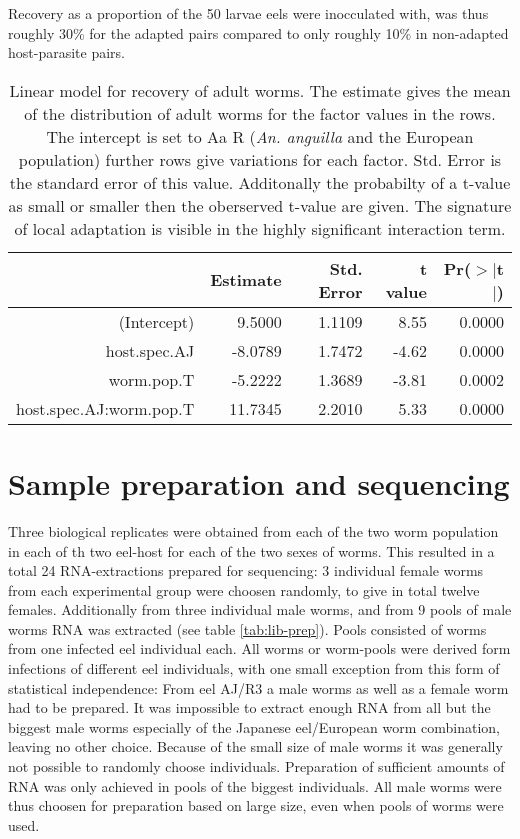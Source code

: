 Recovery as a proportion of the 50 larvae eels were inocculated with,
was thus roughly 30\% for the adapted pairs compared to only roughly
10\% in non-adapted host-parasite pairs.

\begin{table}[ht]
\begin{center}
\begin{tabular}{rrrrr}
  \hline
 & Estimate & Std. Error & t value & Pr($>$$|$t$|$) \\ 
  \hline
  (Intercept) & 9.5000 & 1.1109 & 8.55 & 0.0000 \\ 
  host.spec.AJ & -8.0789 & 1.7472 & -4.62 & 0.0000 \\ 
  worm.pop.T & -5.2222 & 1.3689 & -3.81 & 0.0002 \\ 
  host.spec.AJ:worm.pop.T & 11.7345 & 2.2010 & 5.33 & 0.0000 \\ 
   \hline
\end{tabular}
\caption[Linear model for recovery]{Linear model for recovery of adult
  worms. The estimate gives the mean of the distribution of adult
  worms for the factor values in the rows. The intercept is set to Aa
  R (\textit{An. anguilla} and the European population) further rows
  give variations for each factor. Std. Error is the standard error of
  this value. Additonally the probabilty of a t-value as small or
  smaller then the oberserved t-value are given. The signature of
  local adaptation is visible in the highly significant interaction
  term.}
\label{tab:ad-sig}
\end{center}
\end{table}


\section{Sample preparation and sequencing }

Three biological replicates were obtained from each of the two worm
population in each of th two eel-host for each of the two sexes of
worms. This resulted in a total 24 RNA-extractions prepared for
sequencing: 3 individual female worms from each experimental group
were choosen randomly, to give in total twelve females. Additionally
from three individual male worms, and from 9 pools of male worms RNA
was extracted (see table \ref{tab:lib-prep}). Pools consisted of worms
from one infected eel individual each. All worms or worm-pools were
derived form infections of different eel individuals, with one small
exception from this form of statistical independence: From eel AJ/R3 a
male worms as well as a female worm had to be prepared. It was
impossible to extract enough RNA from all but the biggest male worms
especially of the Japanese eel/European worm combination, leaving no
other choice. Because of the small size of male worms it was generally
not possible to randomly choose individuals. Preparation of sufficient
amounts of RNA was only achieved in pools of the biggest
individuals. All male worms were thus choosen for preparation based on
large size, even when pools of worms were used.

